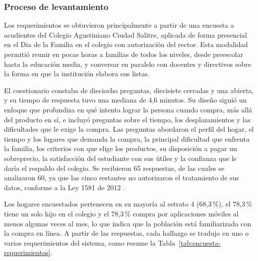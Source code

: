 \subsubsection{Proceso de levantamiento}

Los requerimientos se obtuvieron principalmente a partir de una encuesta a acudientes del
Colegio Agustiniano Ciudad Salitre, aplicada de forma presencial en el Dia de la Familia en el
colegio con autorización del rector. Esta modalidad permitió reunir en pocas horas a familias de todos los niveles,
desde preescolar hasta la educación media, y conversar en paralelo con docentes y directivos
sobre la forma en que la institución elabora sus listas.\par

El cuestionario constaba de dieciocho preguntas, diecisiete cerradas y una abierta, y su
tiempo de respuesta tuvo una mediana de 4,6 minutos. Su diseño siguió un enfoque que profundiza en qué intenta lograr la persona cuando compra, más
allá del producto en sí, e incluyó preguntas sobre el tiempo, los desplazamientos y las
dificultades que le exige la compra. Las
preguntas abordaron el perfil del hogar, el tiempo y los lugares que demanda la compra, la
principal dificultad que enfrenta la familia, los criterios con que elige los productos, su
disposición a pagar un sobreprecio, la satisfacción del estudiante con sus útiles y la
confianza que le daría el respaldo del colegio. Se recibieron 65 respuestas, de las cuales
se analizaron 60, ya que las cinco restantes no autorizaron el tratamiento de sus datos,
conforme a la Ley 1581 de 2012 \citep{congreso_ley1581_2012}.\par

Los hogares encuestados pertenecen en su mayoría al estrato 4 (68,3\,\%), el 78,3\,\% tiene
un solo hijo en el colegio y el 78,3\,\% compra por aplicaciones móviles al menos algunas
veces al mes, lo que indica que la población está familiarizada con la compra en línea. A
partir de las respuestas, cada hallazgo se tradujo en uno o varios requerimientos del
sistema, como resume la Tabla~\ref{tab:encuesta-requerimientos}.\par


